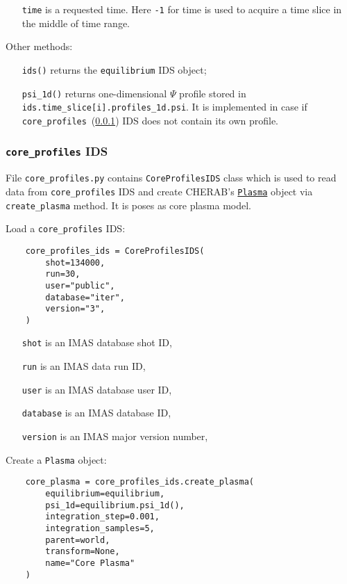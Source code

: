 \documentclass[../main.tex]{subfiles}
\begin{document}
\begin{itemize}[align=left]
    \item[\texttt{time}] is a requested time. Here \texttt{-1} for time is used to acquire a time slice in the middle of time range.
\end{itemize}

Other methods:
\begin{itemize}[align=left]
    \item[\texttt{ids()}] returns the \texttt{equilibrium} IDS object;
    \item[\texttt{psi\_1d()}] returns one-dimensional $\Psi$ profile stored in \texttt{ids.time\_slice[i].profiles\_1d.psi}. It is implemented in case if \texttt{core\_profiles}~(\cref{sec:core_profiles_ids}) IDS does not contain its own profile.
\end{itemize}

\subsubsection{\texttt{core\_profiles} IDS}%
\label{sec:core_profiles_ids}

File \texttt{core\_profiles.py} contains \texttt{CoreProfilesIDS} class which is used to read data from \texttt{core\_profiles} IDS and create CHERAB's \href{https://cherab.github.io/documentation/plasmas/core_plasma_classes.html?highlight=plasma#cherab.core.Plasma}{\texttt{Plasma}} object via \texttt{create\_plasma} method. It is poses as core plasma model.

Load a \texttt{core\_profiles} IDS:
\begin{verbatim}
    core_profiles_ids = CoreProfilesIDS(
        shot=134000,
        run=30,
        user="public",
        database="iter",
        version="3",
    )
\end{verbatim}

\begin{itemize}[align=left]
    \item[\texttt{shot}] is an IMAS database shot ID,
    \item[\texttt{run}] is an IMAS data run ID,
    \item[\texttt{user}] is an IMAS database user ID,
    \item[\texttt{database}] is an IMAS database ID,
    \item[\texttt{version}] is an IMAS major version number,
\end{itemize}

Create a \texttt{Plasma} object:
\begin{verbatim}
    core_plasma = core_profiles_ids.create_plasma(
        equilibrium=equilibrium,
        psi_1d=equilibrium.psi_1d(),
        integration_step=0.001,
        integration_samples=5,
        parent=world,
        transform=None,
        name="Core Plasma"
    )
\end{verbatim}
\end{document}
